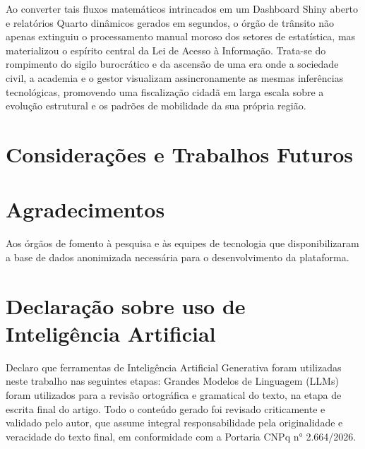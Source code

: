 \documentclass[12pt,a4paper]{article}
\begin{document}
Ao converter tais fluxos matemáticos intrincados em um Dashboard Shiny aberto e relatórios Quarto dinâmicos gerados em segundos, o órgão de trânsito não apenas extinguiu o processamento manual moroso dos setores de estatística, mas materializou o espírito central da Lei de Acesso à Informação. Trata-se do rompimento do sigilo burocrático e da ascensão de uma era onde a sociedade civil, a academia e o gestor visualizam assincronamente as mesmas inferências tecnológicas, promovendo uma fiscalização cidadã em larga escala sobre a evolução estrutural e os padrões de mobilidade da sua própria região.


\section{Considerações e Trabalhos Futuros}
\label{sec:conclui}


\section*{Agradecimentos}
Aos órgãos de fomento à pesquisa e às equipes de tecnologia que disponibilizaram a base de dados anonimizada necessária para o desenvolvimento da plataforma.

\section*{Declaração sobre uso de Inteligência Artificial}
Declaro que ferramentas de Inteligência Artificial Generativa foram utilizadas neste trabalho nas seguintes etapas: Grandes Modelos de Linguagem (LLMs) foram utilizados para a revisão ortográfica e gramatical do texto, na etapa de escrita final do artigo. Todo o conteúdo gerado foi revisado criticamente e validado pelo autor, que assume integral responsabilidade pela originalidade e veracidade do texto final, em conformidade com a Portaria CNPq n° 2.664/2026.




\end{document}
